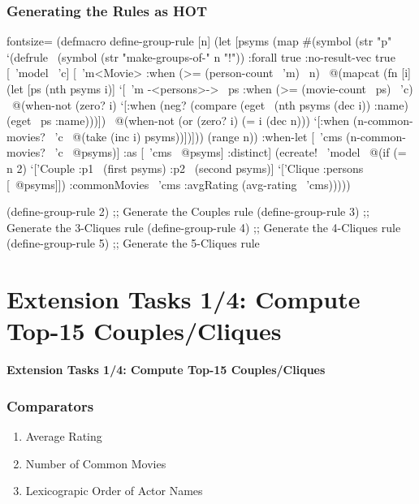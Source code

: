 \documentclass{beamer}
\begin{document}
\begin{frame}[fragile]
  \frametitle{Generating the Rules as HOT}
  \begin{clojurecode*}{fontsize=\tiny}
(defmacro define-group-rule [n]
  (let [psyms (map #(symbol (str "p" %
    `(defrule ~(symbol (str "make-groups-of-" n "!"))
       {:forall true :no-result-vec true}
       [~'model ~'c]
       [~'m<Movie> :when (>= (person-count ~'m) ~n)
        ~@(mapcat (fn [i]
                    (let [ps (nth psyms i)]
                      `[~'m -<persons>-> ~ps
                        :when (>= (movie-count ~ps) ~'c)
                        ~@(when-not (zero? i)
                            `[:when (neg? (compare (eget ~(nth psyms (dec i)) :name)
                                                   (eget ~ps :name)))])
                        ~@(when-not (or (zero? i) (= i (dec n)))
                            `[:when (n-common-movies? ~'c ~@(take (inc i) psyms))])]))
                  (range n))
        :when-let [~'cms (n-common-movies? ~'c ~@psyms)]
        :as [~'cms ~@psyms]
        :distinct]
       (ecreate! ~'model ~@(if (= n 2)
                                 `['Couple :p1 ~(first psyms) :p2 ~(second psyms)]
                                 `['Clique :persons [~@psyms]])
                 :commonMovies ~'cms :avgRating (avg-rating ~'cms)))))

(define-group-rule 2) ;; Generate the Couples rule
(define-group-rule 3) ;; Generate the 3-Cliques rule
(define-group-rule 4) ;; Generate the 4-Cliques rule
(define-group-rule 5) ;; Generate the 5-Cliques rule
  \end{clojurecode*}
\end{frame}

\section{Extension Tasks 1/4: Compute Top-15 Couples/Cliques}

\begin{frame}
  \LARGE
  \begin{center}
    \textbf{Extension Tasks 1/4: Compute Top-15 Couples/Cliques}
  \end{center}
\end{frame}

\begin{frame}
  \frametitle{Comparators}
  \begin{enumerate}
  \item Average Rating
  \item Number of Common Movies
  \item Lexicograpic Order of Actor Names
  \end{enumerate}
\end{frame}
\end{document}
